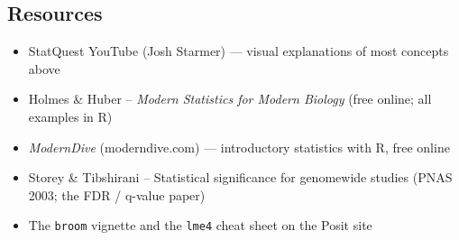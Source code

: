 \subsection{Resources}
\begin{itemize}[nosep]
  \item StatQuest YouTube (Josh Starmer) --- visual explanations of most concepts above
  \item Holmes \& Huber -- \textit{Modern Statistics for Modern Biology} (free online; all examples in R)
  \item \textit{ModernDive} (moderndive.com) --- introductory statistics with R, free online
  \item Storey \& Tibshirani -- Statistical significance for genomewide studies (PNAS 2003; the FDR / q-value paper)
  \item The \texttt{broom} vignette and the \texttt{lme4} cheat sheet on the Posit site
\end{itemize}
